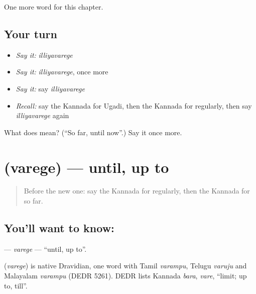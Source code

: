 \begin{grammarlens}[title={What you've built}]
One more word for this chapter.
\end{grammarlens}

\subsection*{Your turn}
\begin{itemize}
\raggedright
  \item \emph{Say it:} \emph{illiyavarege}
  \item \emph{Say it:} \emph{illiyavarege}, once more
  \item \emph{Say it:} say \emph{illiyavarege}
  \item \emph{Recall:} say the Kannada for Ugadi, then the Kannada for regularly, then say \emph{illiyavarege} again
\end{itemize}

\begin{tcolorbox}[breakable,colback=teal!4,colframe=teal!35!black,title={Before you move on}]
What does  mean? (\textquotedblleft{}So far, until now\textquotedblright{}.) Say it once more.
\end{tcolorbox}
\section[\texorpdfstring{\kn{ವರೆಗೆ} (varege)}{ವರೆಗೆ (varege)}]{ (varege) — until, up to}

\label{lesson:KA-C211-varege}



\begin{quote}
Before the new one: say the Kannada for regularly, then the Kannada for so far.
\end{quote}

\subsection*{You'll want to know: }
\textbf{} — \emph{varege} — \textquotedblleft{}until, up to\textquotedblright{}.

\begin{cousinweb}
\textbf{} (\emph{varege}) is native Dravidian, one word with Tamil \emph{varampu}, Telugu \emph{varuju} and Malayalam \emph{varampu} (DEDR 5261). DEDR lists Kannada \emph{bara}, \emph{vare}, \textquotedblleft{}limit; up to, till\textquotedblright{}.
\end{cousinweb}

